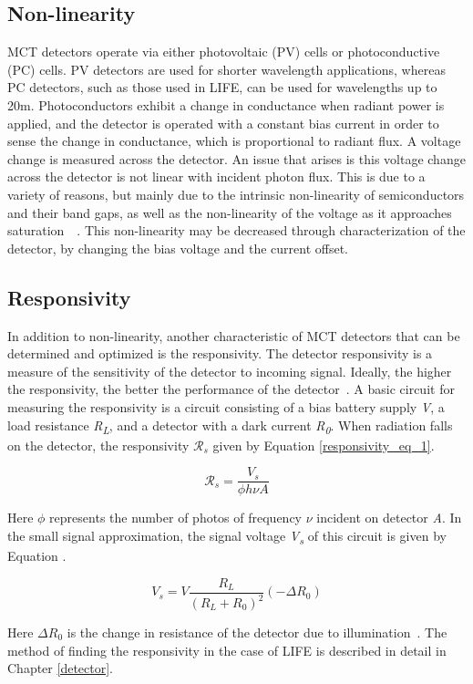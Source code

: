 \subsection{Non-linearity}
MCT detectors operate via either photovoltaic (PV) cells or photoconductive (PC) cells. PV detectors are used for shorter wavelength applications, whereas PC detectors, such as those used in LIFE, can be used for wavelengths up to 20\textmu m. Photoconductors exhibit a change in conductance when radiant power is applied, and the detector is operated with a constant bias current in order to sense the change in conductance, which is proportional to radiant flux. A voltage change is measured across the detector. An issue that arises is this voltage change across the detector is not linear with incident photon flux. This is due to a variety of reasons, but mainly due to the intrinsic non-linearity of semiconductors and their band gaps, as well as the non-linearity of the voltage as it approaches saturation~\citep{current_measurement_MCTs}~\citep{MCT_linearity}.  This non-linearity may be decreased through characterization of the detector, by changing the bias voltage and the current offset.

\subsection {Responsivity}
In addition to non-linearity, another characteristic of MCT detectors that can be determined and optimized is the responsivity. The detector responsivity is a measure of the sensitivity of the detector to incoming signal. Ideally, the higher the responsivity, the better the performance of the detector~\citep{GLORIA_PhD}. A basic circuit for measuring the responsivity is a circuit consisting of a bias battery supply \textit{V}, a load resistance \textit{R\textsubscript{L}}, and a detector with a dark current \textit{R\textsubscript{0}}. When radiation falls on the detector, the responsivity $\mathcal{R}_s$ given by Equation \ref{responsivity_eq_1}.

\begin{equation} \label{responsivity_eq_1}
    \mathcal{R}_s = \frac{V_s}{\phi h \nu A}
\end{equation}

Here $\phi$ represents the number of photos of frequency $\nu$ incident on detector \textit{A}. In the small signal approximation, the signal voltage \textit{V\textsubscript{s}} of this circuit is given by Equation .

\begin{equation}
    V_s = V \frac{R_L}{(R_L+R_0)^2}(-\Delta R_0)
\end{equation}

Here $\Delta R_0$ is the change in resistance of the detector due to illumination~\citep{MCT_responsivity}. The method of finding the responsivity in the case of LIFE is described in detail in Chapter \ref{detector}.